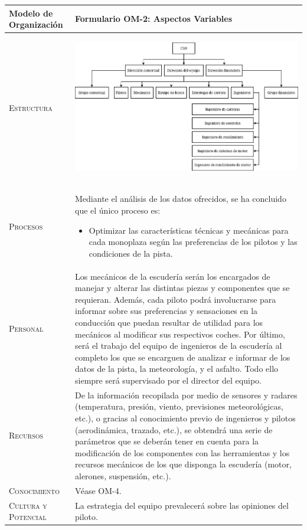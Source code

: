 \documentclass[12pt,a4paper,twoside,spanish]{article}      %
\begin{document}
\begin{table}[H]
\scriptsize
\begin{tabularx}{\textwidth}{|l|X|} \hline
\textbf{Modelo de Organización} & \textbf{Formulario OM-2: Aspectos Variables} \\ \hline\hline

\textsc{Estructura} & 
\begin{center}
    
    \includegraphics[scale=0.4]{estructura.jpg}
\end{center}
\\ \hline
\textsc{Procesos} & Mediante el análisis de los datos ofrecidos, se ha concluido que el único proceso es:
\begin{itemize}
    \item Optimizar las características técnicas y mecánicas para cada monoplaza según las preferencias de los pilotos y las condiciones de la pista.
\end{itemize} \\ \hline
\textsc{Personal} &  Los mecánicos de la escudería serán los encargados de manejar y alterar las distintas piezas y componentes que se requieran. Además, cada piloto podrá involucrarse para informar sobre sus preferencias y sensaciones en la conducción que puedan resultar de utilidad para los mecánicos al modificar sus respectivos coches. Por último, será el trabajo del equipo de ingenieros de la escudería al completo los que se encarguen de analizar e informar de los datos de la pista, la meteorología, y el asfalto. Todo ello siempre será supervisado por el director del equipo.  \\ \hline
\textsc{Recursos} &  De la información recopilada por medio de sensores y radares (temperatura, presión, viento, previsiones meteorológicas, etc.), o gracias al conocimiento previo de ingenieros y pilotos (aerodinámica, trazado, etc.), se obtendrá una serie de parámetros que se deberán tener en cuenta para la modificación de los componentes con las herramientas y los recursos mecánicos de los que disponga la escudería (motor, alerones, suspensión, etc.).
\\ \hline
\textsc{Conocimiento} &  Véase OM-4. \\ \hline
\textsc{Cultura y Potencial} &  La estrategia del equipo prevalecerá sobre las opiniones del piloto.\\ \hline
\end{tabularx}
  \label{tab.OM2}
\end{table}
\end{document}

